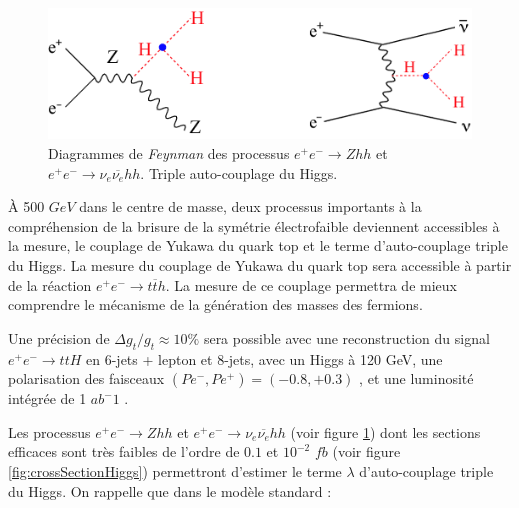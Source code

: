   \begin{figure}[!htb]
    \begin{center} 
      \includegraphics[scale=0.60]{./figures/tripleH_diagram.png}
      \caption{Diagrammes de \textit{Feynman} des processus $e^+ e^- \rightarrow Zhh$ et $e^+  e^- \rightarrow \nu_e \overline{\nu_e} hh$. Triple auto-couplage du Higgs.}
     \label{fig:triple-self_couplingHiggs}
     \end{center}
  \end{figure}    

   \`A 500 $GeV$ dans le centre de masse, deux processus importants \`a la compr\'ehension de la brisure de la sym\'etrie \'electrofaible deviennent accessibles \`a la mesure, le couplage de Yukawa du quark top et le terme d'auto-couplage triple du Higgs. La mesure du couplage de Yukawa du quark top sera accessible \`a partir de la r\'eaction $e^+ e^- \rightarrow t \overline{t} h$. La mesure de ce couplage permettra de mieux comprendre le m\'ecanisme de la g\'en\'eration des masses des fermions. 
   
   Une pr\'ecision de $\Delta g_t /g_t \approx 10\%$ sera possible avec une reconstruction du signal $e^+ e^- \rightarrow ttH$ en 6-jets + lepton et 8-jets, avec un Higgs \`a 120 GeV, une polarisation des faisceaux $(Pe^- , Pe^+ ) = (-0.8, +0.3)$ , et une luminosit\'e int\'egr\'ee de 1 $ab^-{1}$ \cite{Yonamine:2011jg}.

   
   Les processus $e^+ e^- \rightarrow Zhh$ et $e^+  e^- \rightarrow \nu_e \overline{\nu_e} hh$ (voir figure \ref{fig:triple-self_couplingHiggs}) dont les sections efficaces sont tr\`es faibles de l'ordre de $0.1$ et $10^{-2}$ $fb$ (voir figure \ref{fig:crossSectionHiggs}) permettront d'estimer le terme $\lambda$ d'auto-couplage triple du Higgs. On rappelle que dans le mod\`ele standard : 
   
